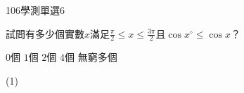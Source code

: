 \begin{QUESTIONS}
\begin{QUESTION}
\begin{QSOLLIST}
        \end{QSOLLIST}
        \begin{QEMPTYSPACE}
        \end{QEMPTYSPACE}
    \end{QUESTION}
    \begin{QUESTION}
        \begin{ExamInfo}{106}{學測}{單選}{6}
        \end{ExamInfo}
        \begin{ExamAnsRateInfo}{22}{43}{16}{7}
        \end{ExamAnsRateInfo}
        \begin{QBODY}
            試問有多少個實數$x$滿足$\frac{\pi }{2}\le x\le \frac{3\pi }{2}$且$\cos x{}^\circ \le \cos x$？
			\begin{QOPS}
				\QOP $0$個     
				\QOP $1$個     
				\QOP $2$個     
				\QOP $4$個     
				\QOP 無窮多個
			\end{QOPS}
        \end{QBODY}
        \begin{QFROMS}
        \end{QFROMS}
        \begin{QTAGS}\end{QTAGS}
        \begin{QANS}
            (1)
        \end{QANS}
        \begin{QSOLLIST}
            \begin{QSOL}[SOLID=39]
            \begin{QOP}
                \begin{QSTEPS}
                \end{QSTEPS}
            \end{QOP}
            \end{QSOL}


\end{QSOLLIST}
\end{QUESTION}
\end{QUESTIONS}
